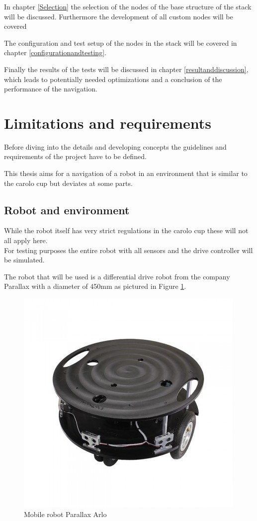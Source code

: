 In chapter \ref{Selection} the selection of the nodes of the base structure of the stack will be discussed. Furthermore the development of all custom nodes will be covered

The configuration and test setup of the nodes in the stack will be covered in chapter \ref{configurationandtesting}.


Finally the results of the tests will be discussed in chapter \ref{resultanddiscussion}, which leads to potentially needed optimizations and a conclusion of the performance of the navigation.

\section{Limitations and requirements}

Before diving into the details and developing concepts the guidelines and requirements of the project have to be defined.

This thesis aims for a navigation of a robot in an environment that is similar to the carolo cup but deviates at some parts.

\subsection{Robot and environment}
While the robot itself has very strict regulations in the carolo cup these will not all apply here.\\

For testing purposes the entire robot with all sensors and the drive controller will be simulated.

The robot that will be used is a differential drive robot from the company Parallax with a diameter of 450mm as pictured in Figure \ref{arlore}.\\

\begin{figure}[H]
	\centering
	\includegraphics[width=.7\textwidth]{arlo real}
	
	\caption{Mobile robot Parallax Arlo \cite{arloreal}}
	\label{arlore}
\end{figure}


